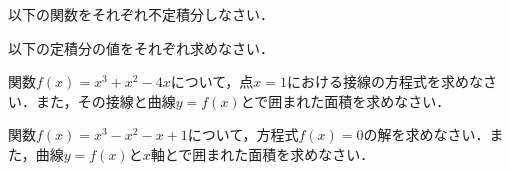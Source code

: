 \begin{questions}

	\newpage
	\question
	以下の関数をそれぞれ不定積分しなさい．
	
	\newpage
	\question
	以下の定積分の値をそれぞれ求めなさい．
	\setlength\answerlinelength{1in}

	\newpage
	\question
	関数$\displaystyle f(x) = x^3 + x^2 - 4x$について，点$x = 1$における接線の方程式を求めなさい．また，その接線と曲線$y = f(x)$とで囲まれた面積を求めなさい．
	
	\newpage
	\question
	関数$\displaystyle f(x) = x^3 - x^2 - x + 1$について，方程式$f(x) = 0$の解を求めなさい．また，曲線$y = f(x)$と$x$軸とで囲まれた面積を求めなさい．
\end{questions}